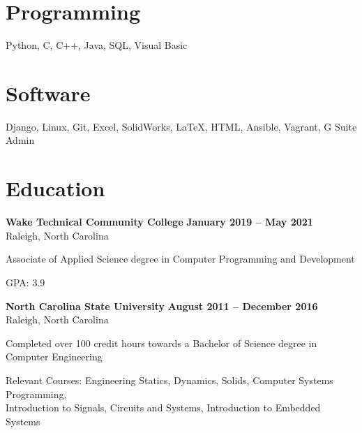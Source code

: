 \documentclass[margin,line]{resume}
\begin{document}
\address{Durham, NC 27704
	\hspace{18mm}
	(704) 799-5153
	\hspace{18mm}
	\href{mailto:jesseaster1@gmail.com}{jesseaster1@gmail.com}
}


\begin{resume}

   

    \section{\mysidestyle Programming}
    Python, C, C++, Java, SQL, Visual Basic
    \vspace{-5mm}

    \section{\mysidestyle Software}
    Django, Linux, Git, Excel, SolidWorks, \LaTeX, HTML, Ansible, Vagrant, G Suite Admin

    \section{\mysidestyle Education}


    \textbf{Wake Technical Community College} \hfill \textbf{January 2019 -- May 2021}\\
    Raleigh, North Carolina\\
    \vspace{-4mm}
    \begin{list2}
    \item Associate of Applied Science degree in Computer Programming and Development
    \item GPA: 3.9
    \end{list2}


    \textbf{North Carolina State University} \hfill \textbf{August 2011 -- December 2016}\\
    Raleigh, North Carolina\\
    \vspace{-4mm}
    \begin{list2}
    \item Completed over 100 credit hours towards a Bachelor of Science degree in Computer Engineering
    \item Relevant Courses: Engineering Statics, Dynamics, Solids, Computer Systems Programming,\\
    Introduction to Signals, Circuits and Systems, Introduction to Embedded Systems
    \end{list2}



\end{resume}
\end{document}
